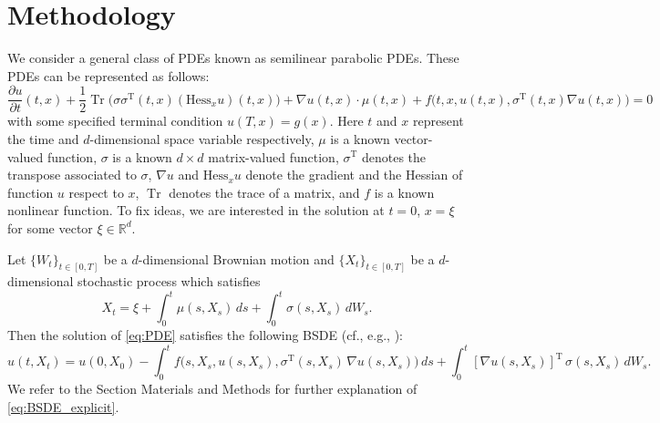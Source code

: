 \documentclass[11pt,english]{article}
\providecommand{\R}{{\ensuremath{\mathbb{R}}}}
\DeclareMathOperator{\Tr}{Tr}
\begin{document}
\section*{\label{sec2}Methodology}
We consider a general class of PDEs known as semilinear parabolic PDEs.
These PDEs can be represented as follows:
\begin{equation}
  \label{eq:PDE}
  \frac{ \partial u}{ \partial t } ( t, x )
  + \frac{1}{2} \! \Tr\!\Big( \sigma\sigma^{\operatorname{T}}(t,x)(\mbox{Hess}_x u) ( t, x ) \Big)
  +\nabla u( t, x )\cdot \mu( t, x )
  +f\big( t, x, u(t,x), \sigma^{\operatorname{T}}( t, x ) \nabla u( t, x ) \big) = 0 
\end{equation}
with some specified terminal condition $u(T,x) = g(x)$. 
Here $t$ and $x$ represent the time 
and $d$-dimensional space variable respectively,
$ \mu $ is a known vector-valued function, 
$\sigma $ is a known $d \times d$ matrix-valued function, 
$\sigma^{\operatorname{T}}$ denotes the transpose associated to $\sigma$, 
$\nabla u$ and $\mbox{Hess}_x u$ denote the gradient and the Hessian of function $u$ respect to $x$,
$\Tr$ denotes the trace of a matrix, and $ f $ is a known nonlinear function.
To fix ideas, we are interested in the solution at $ t = 0 $, $ x = \xi $ 
for some vector $ \xi \in \R^d $.

Let $ \{ W_t \}_{ t \in [0,T] } $ be a $ d$-dimensional Brownian motion and
$ \{ X_t \}_{ t \in [0,T] } $ be a $d$-dimensional stochastic process 
which satisfies
\begin{equation}
  \label{eq:FSDE}
  X_t = \xi + \int_0^t\mu( s, X_s )\, ds +\int_0^t \sigma( s, X_s ) \, dW_s.
\end{equation}
Then the solution of \eqref{eq:PDE} satisfies the following BSDE 
(cf., e.g., \cite{Pardoux1992,Pardoux1999}):
\begin{equation}
  \label{eq:BSDE_explicit}
  u(t, X_t) = 
  u(0, X_0) 
  - 
  \int_0^t f\big( 
    s, X_s, u(s,X_s), \sigma^{ \operatorname{T} }( s, X_s ) \, \nabla u( s, X_s ) 
  \big) \, ds
  + \int_0^t [ \nabla u( s, X_s ) ]^{ \operatorname{T} } \,\sigma( s, X_s )\, dW_s.
\end{equation}
We refer to the Section Materials and Methods for further explanation of \eqref{eq:BSDE_explicit}.
\end{document}
